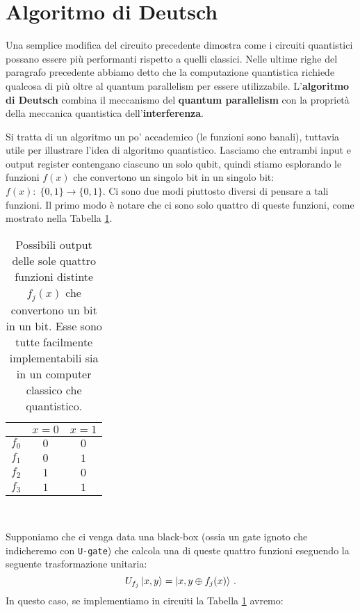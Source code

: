 \section{Algoritmo di Deutsch}
Una semplice modifica del circuito precedente dimostra come i circuiti quantistici possano essere più performanti rispetto a quelli classici. Nelle ultime righe del paragrafo precedente abbiamo detto che la computazione quantistica richiede qualcosa di più oltre al quantum parallelism per essere utilizzabile. L'\textbf{algoritmo di Deutsch} combina il meccanismo del \textbf{quantum parallelism} con la proprietà della meccanica quantistica dell'\textbf{interferenza}. 

\noindent Si tratta di un algoritmo un po' accademico (le funzioni sono banali), tuttavia utile per illustrare l'idea di algoritmo quantistico. Lasciamo che entrambi input e output register contengano ciascuno un solo qubit, quindi stiamo esplorando le funzioni $f(x)$ che convertono un singolo bit in un singolo bit: $f(x): \; \{ 0,1 \} \rightarrow \{ 0,1 \}$. Ci sono due modi piuttosto diversi di pensare a tali funzioni. Il primo modo è notare che ci sono solo quattro di queste funzioni, come mostrato nella Tabella \ref{tab:Deutsch_Fnct}.

\begin{table}[!ht]
	\centering
    \begin{tabular}{ccc}
        \toprule
        & $x = 0$ & $x=1$ \\
        \midrule
        $f_0$ & $0$ & $0$ \\
        $f_1$ & $0$ & $1$ \\
        $f_2$ & $1$ & $0$ \\
        $f_3$ & $1$ & $1$ \\
        \bottomrule
    \end{tabular} \\
    \caption{Possibili output delle sole quattro funzioni distinte $f_j(x)$ che convertono un bit in un bit. Esse sono tutte facilmente implementabili sia in un computer classico che quantistico.}
    \label{tab:Deutsch_Fnct}
\end{table}

\noindent Supponiamo che ci venga data una black-box (ossia un gate ignoto che indicheremo con \texttt{U-gate}) che calcola una di queste quattro funzioni eseguendo la seguente trasformazione unitaria:
\begin{equation*}
    U_{f_j} \ket{x,y} = \ket{x, y \oplus f_j(x)} \, .
\end{equation*}
In questo caso, se implementiamo in circuiti la Tabella \ref{tab:Deutsch_Fnct} avremo:

